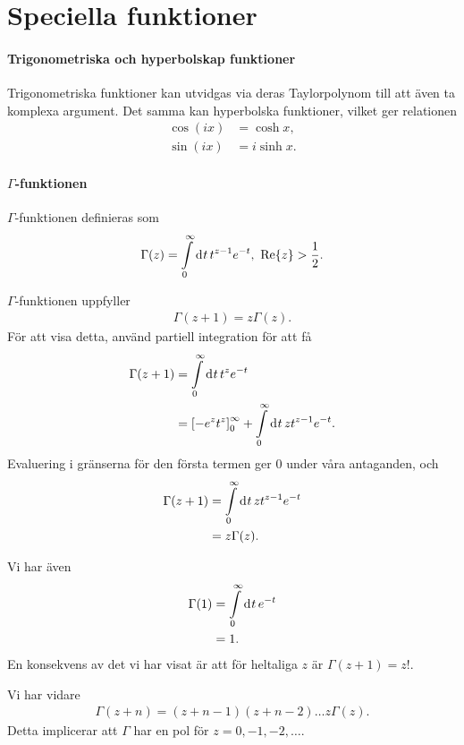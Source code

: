 \section{Speciella funktioner}

\paragraph{Trigonometriska och hyperbolskap funktioner}
Trigonometriska funktioner kan utvidgas via deras Taylorpolynom till att även ta komplexa argument. Det samma kan hyperbolska funktioner, vilket ger relationen
\begin{align*}
	\cos(ix) &= \cosh{x}, \\
	\sin(ix) &= i\sinh{x}.
\end{align*}

\paragraph{$\Gamma$-funktionen}
$\Gamma$-funktionen definieras som
\begin{align*}
	\Gamma(z) = \int\limits_{0}^{\infty}\dd[]{t}t^{z - 1}e^{-t},\ \Re{z} > \frac{1}{2}.
\end{align*}

$\Gamma$-funktionen uppfyller
\begin{align*}
	\Gamma(z + 1) = z\Gamma(z).
\end{align*}
För att visa detta, använd partiell integration för att få
\begin{align*}
	\Gamma(z + 1) &= \int\limits_{0}^{\infty}\dd[]{t}t^{z}e^{-t} \\
	              &= \left[-e^{z}t^{z}\right]_{0}^{\infty} + \int\limits_{0}^{\infty}\dd[]{t}zt^{z - 1}e^{-t}.
\end{align*}
Evaluering i gränserna för den första termen ger $0$ under våra antaganden, och
\begin{align*}
	\Gamma(z + 1) &= \int\limits_{0}^{\infty}\dd[]{t}zt^{z - 1}e^{-t} \\
	              &= z\Gamma(z).
\end{align*}

Vi har även
\begin{align*}
	\Gamma(1) &= \int\limits_{0}^{\infty}\dd[]{t}e^{-t} \\
	          &= 1.
\end{align*}
En konsekvens av det vi har visat är att för heltaliga $z$ är $\Gamma(z + 1) = z!$.

Vi har vidare
\begin{align*}
	\Gamma(z + n) = (z + n - 1)(z + n - 2)\dots z\Gamma(z).
\end{align*}
Detta implicerar att $\Gamma$ har en pol för $z = 0, -1, -2, \dots$.

